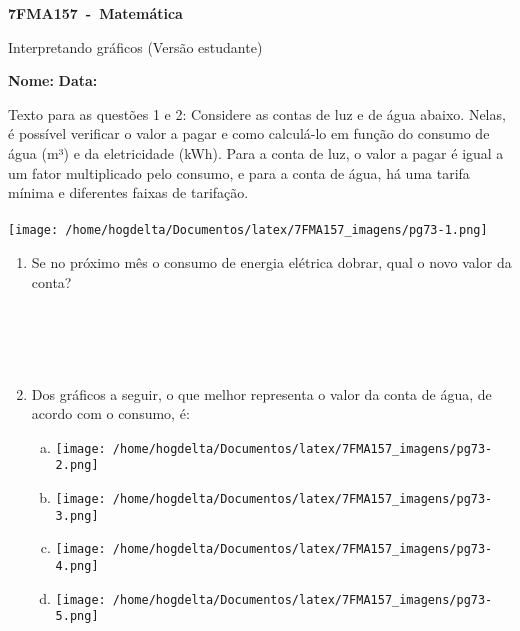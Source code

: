 \documentclass[a4paper,14pt]{article}
\begin{document}
	
	\noindent\textbf{7FMA157~-~Matemática} 
	
	\begin{center}Interpretando gráficos (Versão estudante)
	\end{center}
	
	
	\noindent\textbf{Nome:} \underline{\hspace{10cm}}
    \noindent\textbf{Data:} \underline{\hspace{4cm}}
	
	
	\begin{multicols}{2}
		Texto para as questões 1 e 2:
		Considere as contas de luz e de água abaixo. Nelas, é possível verificar o valor a pagar e como calculá-lo em função do consumo de água (m³) e da eletricidade (kWh). Para a conta de luz, o valor a pagar é igual a um fator multiplicado pelo consumo, e para a conta de água, há uma tarifa mínima e diferentes faixas de tarifação.\\\\
		\texttt{[image: /home/hogdelta/Documentos/latex/7FMA157\_imagens/pg73-1.png]}
		\begin{enumerate}
			\item Se no próximo mês o consumo de energia elétrica dobrar, qual o novo valor da conta? \\\\\\\\\\
			\item Dos gráficos a seguir, o que melhor representa o valor da conta de água, de acordo com o consumo, é:
			\begin{enumerate}[a)]
				\item \texttt{[image: /home/hogdelta/Documentos/latex/7FMA157\_imagens/pg73-2.png]}
				\item \texttt{[image: /home/hogdelta/Documentos/latex/7FMA157\_imagens/pg73-3.png]}
				\item \texttt{[image: /home/hogdelta/Documentos/latex/7FMA157\_imagens/pg73-4.png]}
				\item \texttt{[image: /home/hogdelta/Documentos/latex/7FMA157\_imagens/pg73-5.png]}
			\end{enumerate}

\end{enumerate}
\end{multicols}
\end{document}
